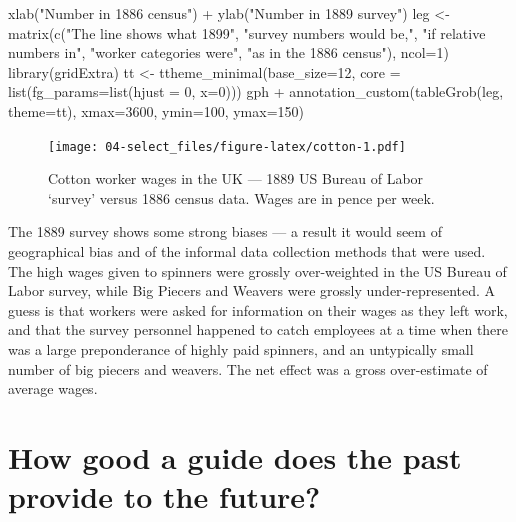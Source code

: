 \documentclass[
  10pt,
  b5paper]{book}
\newenvironment{Shaded}{\begin{snugshade}}{\end{snugshade}}
\newcommand{\AttributeTok}[1]{\textcolor[rgb]{0.77,0.63,0.00}{#1}}
\newcommand{\DecValTok}[1]{\textcolor[rgb]{0.00,0.00,0.81}{#1}}
\newcommand{\FunctionTok}[1]{\textcolor[rgb]{0.00,0.00,0.00}{#1}}
\newcommand{\NormalTok}[1]{#1}
\newcommand{\OtherTok}[1]{\textcolor[rgb]{0.56,0.35,0.01}{#1}}
\newcommand{\SpecialCharTok}[1]{\textcolor[rgb]{0.00,0.00,0.00}{#1}}
\newcommand{\StringTok}[1]{\textcolor[rgb]{0.31,0.60,0.02}{#1}}
\begin{document}
\begin{Shaded}
\begin{Highlighting}[]
  \FunctionTok{xlab}\NormalTok{(}\StringTok{"Number in 1886 census"}\NormalTok{) }\SpecialCharTok{+} \FunctionTok{ylab}\NormalTok{(}\StringTok{"Number in 1889 survey"}\NormalTok{)}
\NormalTok{leg }\OtherTok{\textless{}{-}} \FunctionTok{matrix}\NormalTok{(}\FunctionTok{c}\NormalTok{(}\StringTok{"The line shows what 1899"}\NormalTok{,}
                \StringTok{"survey numbers would be,"}\NormalTok{,}
                \StringTok{"if relative numbers in"}\NormalTok{,}
                \StringTok{"worker categories were"}\NormalTok{,}
                \StringTok{"as in the 1886 census"}\NormalTok{), }\AttributeTok{ncol=}\DecValTok{1}\NormalTok{)}
\FunctionTok{library}\NormalTok{(gridExtra)}
\NormalTok{tt }\OtherTok{\textless{}{-}} \FunctionTok{ttheme\_minimal}\NormalTok{(}\AttributeTok{base\_size=}\DecValTok{12}\NormalTok{, }
                     \AttributeTok{core =} \FunctionTok{list}\NormalTok{(}\AttributeTok{fg\_params=}\FunctionTok{list}\NormalTok{(}\AttributeTok{hjust =} \DecValTok{0}\NormalTok{, }\AttributeTok{x=}\DecValTok{0}\NormalTok{)))}
\NormalTok{gph }\SpecialCharTok{+} \FunctionTok{annotation\_custom}\NormalTok{(}\FunctionTok{tableGrob}\NormalTok{(leg, }\AttributeTok{theme=}\NormalTok{tt), }
                       \AttributeTok{xmax=}\DecValTok{3600}\NormalTok{, }\AttributeTok{ymin=}\DecValTok{100}\NormalTok{, }\AttributeTok{ymax=}\DecValTok{150}\NormalTok{)}
\end{Highlighting}
\end{Shaded}

\begin{figure}
\centering
\texttt{[image: 04-select\_files/figure-latex/cotton-1.pdf]}
\caption{\label{fig:cotton}Cotton worker wages in the UK --- 1889 US Bureau of Labor `survey'
versus 1886 census data. Wages are in pence per week.}
\end{figure}

The 1889 survey shows some strong biases --- a result it
would seem of geographical bias and of the informal data
collection methods that were used. The high wages given to
spinners were grossly over-weighted in the US Bureau of
Labor survey, while Big Piecers and Weavers were grossly
under-represented. A guess is that workers were asked for
information on their wages as they left work, and that
the survey personnel happened to catch employees at a time
when there was a large preponderance of highly paid spinners,
and an untypically small number of big piecers and weavers.
The net effect was a gross over-estimate of average wages.

\hypertarget{how-good-a-guide-does-the-past-provide-to-the-future}{%
\section{How good a guide does the past provide to the future?}\label{how-good-a-guide-does-the-past-provide-to-the-future}}
\end{document}
